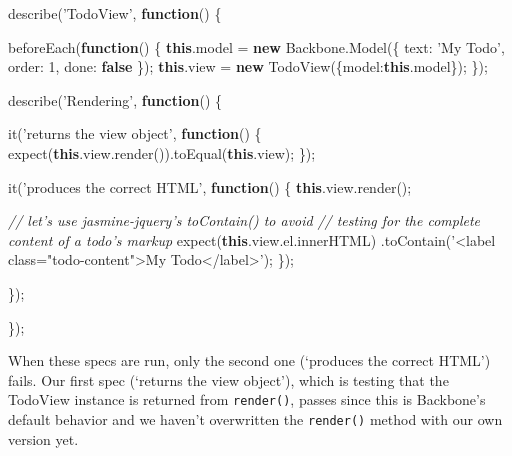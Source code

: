 \documentclass[9pt]{book}
\newenvironment{Shaded}{}{}
\newcommand{\KeywordTok}[1]{\textcolor[rgb]{0.00,0.44,0.13}{\textbf{{#1}}}}
\newcommand{\DataTypeTok}[1]{\textcolor[rgb]{0.56,0.13,0.00}{{#1}}}
\newcommand{\DecValTok}[1]{\textcolor[rgb]{0.25,0.63,0.44}{{#1}}}
\newcommand{\StringTok}[1]{\textcolor[rgb]{0.25,0.44,0.63}{{#1}}}
\newcommand{\CommentTok}[1]{\textcolor[rgb]{0.38,0.63,0.69}{\textit{{#1}}}}
\newcommand{\OtherTok}[1]{\textcolor[rgb]{0.00,0.44,0.13}{{#1}}}
\newcommand{\FunctionTok}[1]{\textcolor[rgb]{0.02,0.16,0.49}{{#1}}}
\newcommand{\NormalTok}[1]{{#1}}
\begin{document}
\begin{Shaded}
\begin{Highlighting}[]
\FunctionTok{describe}\NormalTok{(}\StringTok{'TodoView'}\NormalTok{, }\KeywordTok{function}\NormalTok{() \{}

  \FunctionTok{beforeEach}\NormalTok{(}\KeywordTok{function}\NormalTok{() \{}
    \KeywordTok{this}\NormalTok{.}\FunctionTok{model} \NormalTok{= }\KeywordTok{new} \OtherTok{Backbone}\NormalTok{.}\FunctionTok{Model}\NormalTok{(\{}
      \DataTypeTok{text}\NormalTok{: }\StringTok{'My Todo'}\NormalTok{,}
      \DataTypeTok{order}\NormalTok{: }\DecValTok{1}\NormalTok{,}
      \DataTypeTok{done}\NormalTok{: }\KeywordTok{false}
    \NormalTok{\});}
    \KeywordTok{this}\NormalTok{.}\FunctionTok{view} \NormalTok{= }\KeywordTok{new} \FunctionTok{TodoView}\NormalTok{(\{}\DataTypeTok{model}\NormalTok{:}\KeywordTok{this}\NormalTok{.}\FunctionTok{model}\NormalTok{\});}
  \NormalTok{\});}

  \FunctionTok{describe}\NormalTok{(}\StringTok{'Rendering'}\NormalTok{, }\KeywordTok{function}\NormalTok{() \{}

    \FunctionTok{it}\NormalTok{(}\StringTok{'returns the view object'}\NormalTok{, }\KeywordTok{function}\NormalTok{() \{}
      \FunctionTok{expect}\NormalTok{(}\KeywordTok{this}\NormalTok{.}\OtherTok{view}\NormalTok{.}\FunctionTok{render}\NormalTok{()).}\FunctionTok{toEqual}\NormalTok{(}\KeywordTok{this}\NormalTok{.}\FunctionTok{view}\NormalTok{);}
    \NormalTok{\});}

    \FunctionTok{it}\NormalTok{(}\StringTok{'produces the correct HTML'}\NormalTok{, }\KeywordTok{function}\NormalTok{() \{}
      \KeywordTok{this}\NormalTok{.}\OtherTok{view}\NormalTok{.}\FunctionTok{render}\NormalTok{();}

      \CommentTok{// let's use jasmine-jquery's toContain() to avoid}
      \CommentTok{// testing for the complete content of a todo's markup}
      \FunctionTok{expect}\NormalTok{(}\KeywordTok{this}\NormalTok{.}\OtherTok{view}\NormalTok{.}\OtherTok{el}\NormalTok{.}\FunctionTok{innerHTML}\NormalTok{)}
        \NormalTok{.}\FunctionTok{toContain}\NormalTok{(}\StringTok{'<label class="todo-content">My Todo</label>'}\NormalTok{);}
    \NormalTok{\});}

  \NormalTok{\});}

\NormalTok{\});}
\end{Highlighting}
\end{Shaded}

When these specs are run, only the second one (`produces the correct
HTML') fails. Our first spec (`returns the view object'), which is
testing that the TodoView instance is returned from \texttt{render()},
passes since this is Backbone's default behavior and we haven't
overwritten the \texttt{render()} method with our own version yet.
\end{document}

